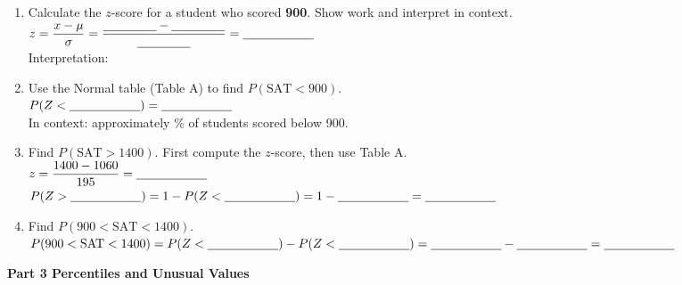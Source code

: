 \documentclass[10pt]{article}
\begin{document}
\begin{enumerate}[leftmargin=1.5em, itemsep=8pt, resume]

  \item Calculate the $z$-score for a student who scored \textbf{900}.
        Show work and interpret in context.\\[5pt]
        $z = \dfrac{x - \mu}{\sigma} = \dfrac{\blank{1.5cm} - \blank{1.5cm}}{\blank{1.5cm}} = \blank{2cm}$\\[6pt]
        Interpretation: \writeline

  \item Use the Normal table (Table A) to find $P(\text{SAT} < 900)$.\\[5pt]
        $P(Z < \blank{2cm}) = \blank{2cm}$\\[4pt]
        In context: approximately \blank{3cm}\% of students scored below 900.

  \item Find $P(\text{SAT} > 1400)$.
        First compute the $z$-score, then use Table A.\\[5pt]
        $z = \dfrac{1400 - 1060}{195} = \blank{2cm}$\\[4pt]
        $P(Z > \blank{2cm}) = 1 - P(Z < \blank{2cm}) = 1 - \blank{2cm} = \blank{2cm}$

  \item Find $P(900 < \text{SAT} < 1400)$.\\[5pt]
        $P(900 < \text{SAT} < 1400) = P(Z < \blank{2cm}) - P(Z < \blank{2cm}) = \blank{2cm} - \blank{2cm} = \blank{2cm}$

\end{enumerate}

\vspace{0.12in}

{\large\bfseries\color{navy} Part 3 \quad Percentiles and Unusual Values}

\vspace{0.10in}
\end{document}
